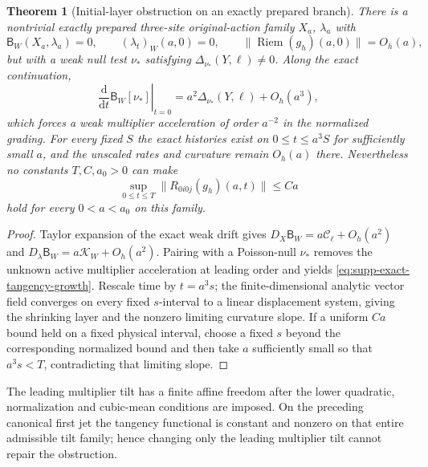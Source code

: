 \documentclass[11pt]{article}
\newtheorem{theorem}{Theorem}[section]
\theoremstyle{definition}
\theoremstyle{remark}
\newcommand{\dd}{\mathrm d}
\begin{document}
\begin{theorem}[Initial-layer obstruction on an exactly prepared branch]
\label{thm:supp-exact-initial-layer}
There is a nontrivial exactly prepared three-site original-action family
$X_a$, $\lambda_a$ with
\begin{equation}
 \mathsf B_W(X_a,\lambda_a)=0,
 \qquad (\lambda_t)_W(a,0)=0,
 \qquad \|\operatorname{Riem}(g_h)(a,0)\|=O_h(a),
 \label{eq:supp-exact-prepared-zero-rate}
\end{equation}
but with a weak null test $\nu_*$ satisfying
$\Delta_{\nu_*}(Y,\ell)\ne0$.  Along the exact continuation,
\begin{equation}
 \left.\frac{\dd}{\dd t}\mathsf B_W[\nu_*]\right|_{t=0}
 =a^2\Delta_{\nu_*}(Y,\ell)+O_h(a^3),
 \label{eq:supp-exact-tangency-growth}
\end{equation}
which forces a weak multiplier acceleration of order $a^{-2}$ in the
normalized grading.  For every fixed $S$ the exact histories exist on
$0\le t\le a^3S$ for sufficiently small $a$, and the unscaled rates and
curvature remain $O_h(a)$ there.  Nevertheless no constants $T,C,a_0>0$ can
make
\begin{equation}
 \sup_{0\le t\le T}\|R_{0i0j}(g_h)(a,t)\|\le Ca
 \label{eq:supp-exact-no-linear-fixed-time}
\end{equation}
hold for every $0<a<a_0$ on this family.
\end{theorem}
\begin{proof}
Taylor expansion of the exact weak drift gives
$D_X\mathsf B_W=a\mathcal C_\ell+O_h(a^2)$ and
$D_\lambda\mathsf B_W=a\mathcal K_W+O_h(a^2)$.  Pairing with a Poisson-null
$\nu_*$ removes the unknown active multiplier acceleration at leading order
and yields \eqref{eq:supp-exact-tangency-growth}.  Rescale time by
$t=a^3s$; the finite-dimensional analytic vector field converges on every
fixed $s$-interval to a linear displacement system, giving the shrinking
layer and the nonzero limiting curvature slope.  If a uniform $Ca$ bound
held on a fixed physical interval, choose a fixed $s$ beyond the corresponding
normalized bound and then take $a$ sufficiently small so that $a^3s<T$,
contradicting that limiting slope.
\end{proof}

The leading multiplier tilt has a finite affine freedom after the lower
quadratic, normalization and cubic-mean conditions are imposed.  On the
preceding canonical first jet the tangency functional is constant and nonzero
on that entire admissible tilt family; hence changing only the leading
multiplier tilt cannot repair the obstruction.
\end{document}
